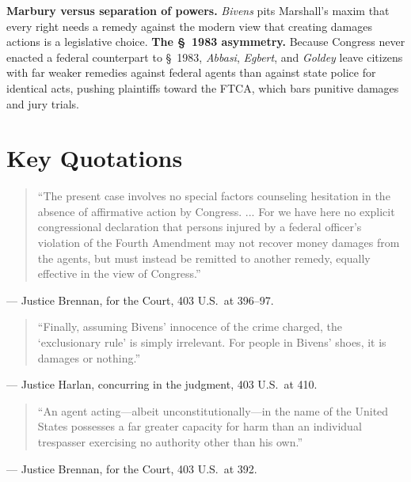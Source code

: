 \documentclass[12pt]{article}
\begin{document}
\textbf{Marbury versus separation of powers.} \textit{Bivens} pits Marshall's maxim that every right needs a remedy against the modern view that creating damages actions is a legislative choice. \textbf{The \S~1983 asymmetry.} Because Congress never enacted a federal counterpart to \S~1983, \textit{Abbasi}, \textit{Egbert}, and \textit{Goldey} leave citizens with far weaker remedies against federal agents than against state police for identical acts, pushing plaintiffs toward the FTCA, which bars punitive damages and jury trials.

\section{Key Quotations}

\begin{quote}
``The present case involves no special factors counseling hesitation in the absence of affirmative action by Congress. ... For we have here no explicit congressional declaration that persons injured by a federal officer's violation of the Fourth Amendment may not recover money damages from the agents, but must instead be remitted to another remedy, equally effective in the view of Congress.''
\end{quote}
\noindent --- Justice Brennan, for the Court, 403 U.S.\ at 396--97.

\begin{quote}
``Finally, assuming Bivens' innocence of the crime charged, the `exclusionary rule' is simply irrelevant. For people in Bivens' shoes, it is damages or nothing.''
\end{quote}
\noindent --- Justice Harlan, concurring in the judgment, 403 U.S.\ at 410.

\begin{quote}
``An agent acting---albeit unconstitutionally---in the name of the United States possesses a far greater capacity for harm than an individual trespasser exercising no authority other than his own.''
\end{quote}
\noindent --- Justice Brennan, for the Court, 403 U.S.\ at 392.
\end{document}
